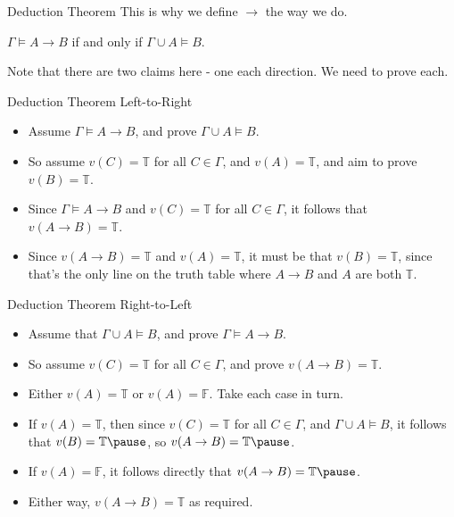 \documentclass[
  ignorenonframetext,
]{beamer}
\providecommand{\tightlist}{%
  \setlength{\itemsep}{0pt}\setlength{\parskip}{0pt}}
\renewcommand{\,}{\text{, }}
\renewenvironment*{quote}	
	{\list{}{\rightmargin   \leftmargin} \item } 	
	{\endlist }
\def\True{\mathbb{T}}
\def\False{\mathbb{F}}
\begin{document}
\begin{frame}{Deduction Theorem}
\protect\hypertarget{deduction-theorem}{}
This is why we define \(\rightarrow\) the way we do.

\begin{quote}
\(\Gamma \vDash A \rightarrow B\) if and only if
\(\Gamma \cup A \vDash B\).
\end{quote}

Note that there are two claims here - one each direction. We need to
prove each.
\end{frame}

\begin{frame}{Deduction Theorem Left-to-Right}
\protect\hypertarget{deduction-theorem-left-to-right}{}
\begin{itemize}
\tightlist
\item
  Assume \(\Gamma \vDash A \rightarrow B\), and prove
  \(\Gamma \cup A \vDash B\).
\item
  So assume \(v(C) = \True\) for all \(C \in \Gamma\), and
  \(v(A) = \True\), and aim to prove \(v(B) = \True\).\pause
\item
  Since \(\Gamma \vDash A \rightarrow B\) and \(v(C) = \True\) for all
  \(C \in \Gamma\), it follows that
  \(v(A \rightarrow B) = \True\).\pause
\item
  Since \(v(A \rightarrow B) = \True\) and \(v(A) = \True\), it must be
  that \(v(B) = \True\), since that's the only line on the truth table
  where \(A \rightarrow B\) and \(A\) are both \(\True\).
\end{itemize}
\end{frame}

\begin{frame}{Deduction Theorem Right-to-Left}
\protect\hypertarget{deduction-theorem-right-to-left}{}
\begin{itemize}
\tightlist
\item
  Assume that \(\Gamma \cup A \vDash B\), and prove
  \(\Gamma \vDash A \rightarrow B\).
\item
  So assume \(v(C) = \True\) for all \(C \in \Gamma\), and prove
  \(v(A \rightarrow B) = \True\). \pause
\item
  Either \(v(A) = \True\) or \(v(A) = \False\). Take each case in
  turn.\pause
\item
  If \(v(A) = \True\), then since \(v(C) = \True\) for all
  \(C \in \Gamma\), and \(\Gamma \cup A \vDash B\), it follows that
  \(v(B) = \True \pause\), so \(v(A \rightarrow B) = \True \pause\).
\item
  If \(v(A) = \False\), it follows directly that
  \(v(A \rightarrow B) = \True \pause\).
\item
  Either way, \(v(A \rightarrow B) = \True\) as required.
\end{itemize}
\end{frame}
\end{document}
